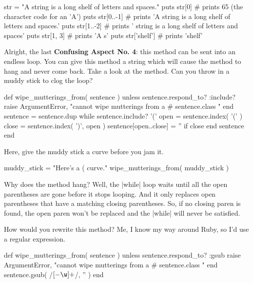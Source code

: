 \documentclass[12pt,twoside]{report}
\begin{document}
\begin{rubycode}

 str = "A string is a long shelf of letters and spaces."
 puts str[0]       # prints 65 (the character code for an 'A')
 puts str[0..-1]   # prints 'A string is a long shelf of letters and spaces.'
 puts str[1..-2]   # prints ' string is a long shelf of letters and spaces'
 puts str[1, 3]    # prints 'A s'
 puts str['shelf'] # prints 'shelf'

\end{rubycode}


Alright, the last {\bf Confusing Aspect No. 4}: this method can be
sent into an endless loop. You can give this method a string which
will cause the method to hang and never come back. Take a look at the
method.  Can you throw in a muddy stick to clog the loop?


\begin{rubycode}

 def wipe_mutterings_from( sentence )
   unless sentence.respond_to? :include?
     raise ArgumentError,
       "cannot wipe mutterings from a #{ sentence.class }"
   end
   sentence = sentence.dup
   while sentence.include? '('
     open = sentence.index( '(' )
     close = sentence.index( ')', open )
     sentence[open..close] = '' if close
   end
   sentence
 end

\end{rubycode}


Here, give the muddy stick a curve before you jam it.


\begin{rubycode}

 muddy_stick = "Here's a ( curve."
 wipe_mutterings_from( muddy_stick )

\end{rubycode}


Why does the method hang?  Well, the
\rubyinline|while| loop waits until all the open
parentheses are gone before it stops looping.  And it only replaces
open parentheses that have a matching closing parentheses.  So, if no
closing paren is found, the open paren won't be replaced and the
\rubyinline|while| will never be satisfied.

How would you rewrite this method?  Me, I know my way around Ruby, so
I'd use a regular expression.


\begin{rubycode}

 def wipe_mutterings_from( sentence )
   unless sentence.respond_to? :gsub
     raise ArgumentError,
       "cannot wipe mutterings from a #{ sentence.class }"
   end
   sentence.gsub( /\([-\w]+\)/, '' )
 end

\end{rubycode}
\end{document}
